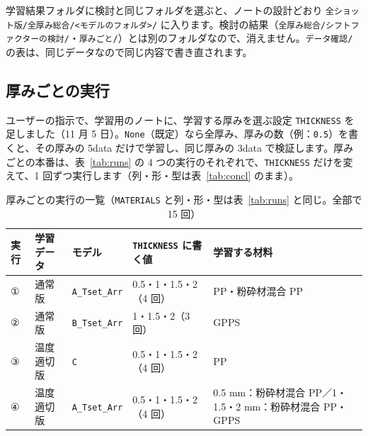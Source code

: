 \documentclass[paper=a4paper,fontsize=10.5pt,line_length=44zw,number_of_lines=40]{jlreq}
\begin{document}
\begin{itemize}[itemsep=0.3ex,topsep=0.4ex]
\begin{itemize}[itemsep=0.1ex,topsep=0.2ex]
\end{itemize}
\end{itemize}
学習結果フォルダに検討と同じフォルダを選ぶと、ノートの設計どおり \texttt{全ショット版/\allowbreak{}全厚み総合/\allowbreak{}<モデルのフォルダ>/\allowbreak{}} に入ります。検討の結果（\texttt{全厚み総合/\allowbreak{}シフトファクターの検討/\allowbreak{}}・\texttt{厚みごと/\allowbreak{}}）とは別のフォルダなので、消えません。\texttt{データ確認/\allowbreak{}} の表は、同じデータなので同じ内容で書き直されます。

\subsection{厚みごとの実行}\label{sec:thickrun}
ユーザーの指示で、学習用のノートに、学習する厚みを選ぶ設定 \texttt{THICKNESS} を足しました（11 月 5 日）。\texttt{None}（既定）なら全厚み、厚みの数（例：\texttt{0.5}）を書くと、その厚みの 5data だけで学習し、同じ厚みの 3data で検証します。厚みごとの本番は、表~\ref{tab:runs} の 4 つの実行のそれぞれで、\texttt{THICKNESS} だけを変えて、1 回ずつ実行します（列・形・型は表~\ref{tab:concl} のまま）。
\begin{table}[H]\centering\footnotesize
\caption{厚みごとの実行の一覧（\texttt{MATERIALS} と列・形・型は表~\ref{tab:runs} と同じ。全部で 15 回）}\label{tab:truns}
\begin{tabular}{lllp{9\zw}p{15\zw}}
\toprule
実行 & 学習データ & モデル & \texttt{THICKNESS} に書く値 & 学習する材料 \\
\midrule
① & 通常版 & \texttt{A\_\allowbreak{}Tset\_\allowbreak{}Arr} & 0.5・1・1.5・2（4 回） & PP・粉砕材混合 PP \\
② & 通常版 & \texttt{B\_\allowbreak{}Tset\_\allowbreak{}Arr} & 1・1.5・2（3 回） & GPPS \\
③ & 温度適切版 & \texttt{C} & 0.5・1・1.5・2（4 回） & PP \\
④ & 温度適切版 & \texttt{A\_\allowbreak{}Tset\_\allowbreak{}Arr} & 0.5・1・1.5・2（4 回） & 0.5 mm：粉砕材混合 PP／1・1.5・2 mm：粉砕材混合 PP・GPPS \\
\bottomrule
\end{tabular}
\end{table}
\end{document}
